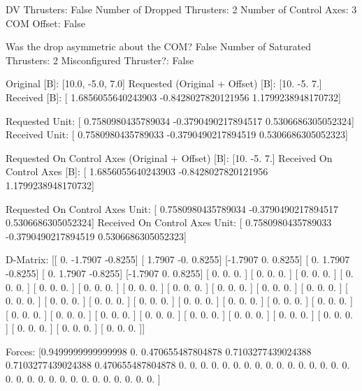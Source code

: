 DV Thrusters:	False
Number of Dropped Thrusters:	2
Number of Control Axes:	3
COM Offset:	False

Was the drop asymmetric about the COM?	False
Number of Saturated Thrusters:	2
Misconfigured Thruster?:	False

Original [B]:	[10.0, -5.0, 7.0]
Requested (Original + Offset) [B]:	[10. -5.  7.]
Received [B]:		[ 1.6856055640243903 -0.8428027820121956  1.1799238948170732]

Requested Unit:		[ 0.7580980435789034 -0.3790490217894517  0.5306686305052324]
Received Unit:		[ 0.7580980435789033 -0.3790490217894519  0.5306686305052323]

Requested On Control Axes (Original + Offset) [B]:	[10. -5.  7.]
Received On Control Axes [B]:		[ 1.6856055640243903 -0.8428027820121956  1.1799238948170732]

Requested On Control Axes Unit:		[ 0.7580980435789034 -0.3790490217894517  0.5306686305052324]
Received On Control Axes Unit:		[ 0.7580980435789033 -0.3790490217894519  0.5306686305052323]

D-Matrix:
[[ 0.     -1.7907 -0.8255]
 [ 1.7907 -0.      0.8255]
 [-1.7907  0.      0.8255]
 [ 0.      1.7907 -0.8255]
 [ 0.      1.7907 -0.8255]
 [-1.7907  0.      0.8255]
 [ 0.      0.      0.    ]
 [ 0.      0.      0.    ]
 [ 0.      0.      0.    ]
 [ 0.      0.      0.    ]
 [ 0.      0.      0.    ]
 [ 0.      0.      0.    ]
 [ 0.      0.      0.    ]
 [ 0.      0.      0.    ]
 [ 0.      0.      0.    ]
 [ 0.      0.      0.    ]
 [ 0.      0.      0.    ]
 [ 0.      0.      0.    ]
 [ 0.      0.      0.    ]
 [ 0.      0.      0.    ]
 [ 0.      0.      0.    ]
 [ 0.      0.      0.    ]
 [ 0.      0.      0.    ]
 [ 0.      0.      0.    ]
 [ 0.      0.      0.    ]
 [ 0.      0.      0.    ]
 [ 0.      0.      0.    ]
 [ 0.      0.      0.    ]
 [ 0.      0.      0.    ]
 [ 0.      0.      0.    ]
 [ 0.      0.      0.    ]
 [ 0.      0.      0.    ]
 [ 0.      0.      0.    ]
 [ 0.      0.      0.    ]
 [ 0.      0.      0.    ]
 [ 0.      0.      0.    ]]

Forces:
[0.9499999999999998 0.                 0.470655487804878
 0.7103277439024388 0.7103277439024388 0.470655487804878
 0.                 0.                 0.
 0.                 0.                 0.
 0.                 0.                 0.
 0.                 0.                 0.
 0.                 0.                 0.
 0.                 0.                 0.
 0.                 0.                 0.
 0.                 0.                 0.
 0.                 0.                 0.
 0.                 0.                 0.                ]

